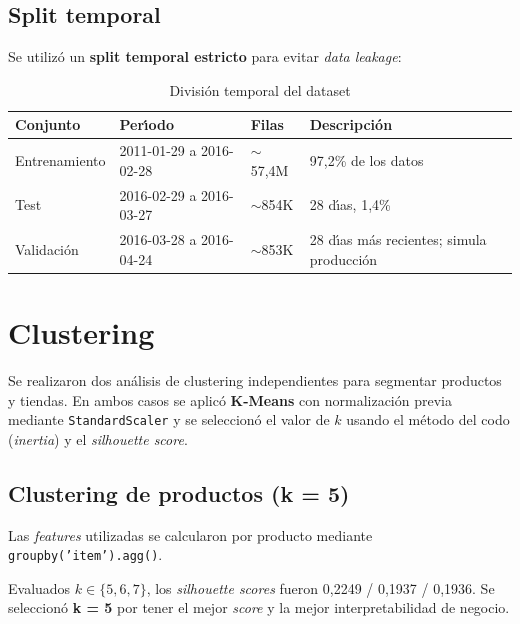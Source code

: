 \documentclass[12pt, a4paper, oneside]{report}
\newcommand{\code}[1]{\texttt{\small\color{codeblue}#1}}
\begin{document}
\subsection{Split temporal}

Se utiliz\'o un \textbf{split temporal estricto} para evitar \textit{data leakage}:

\begin{table}[H]
  \centering
  \caption{Divisi\'on temporal del dataset}
  \label{tab:split}
  \begin{tabularx}{\textwidth}{L{2.2cm} L{4.5cm} C{2cm} X}
    \toprule
    {\color{white}\textbf{Conjunto}} &
    {\color{white}\textbf{Per\'{\i}odo}} &
    {\color{white}\textbf{Filas}} &
    {\color{white}\textbf{Descripci\'on}} \\
    \midrule
       Entrenamiento & 2011-01-29 a 2016-02-28 & $\sim$57,4M & 97,2\% de los datos \\
      Test          & 2016-02-29 a 2016-03-27 & $\sim$854K  & 28 d\'{\i}as, 1,4\% \\
       Validaci\'on    & 2016-03-28 a 2016-04-24 & $\sim$853K  & 28 d\'{\i}as m\'as recientes; simula producci\'on \\
    \bottomrule
  \end{tabularx}
\end{table}

\section{Clustering}

Se realizaron dos an\'alisis de clustering independientes para segmentar productos y tiendas. En ambos casos se aplic\'o \textbf{K-Means} con normalizaci\'on previa mediante \code{StandardScaler} y se seleccion\'o el valor de $k$ usando el m\'etodo del codo (\textit{inertia}) y el \textit{silhouette score}.

\subsection{Clustering de productos (k = 5)}

Las \textit{features} utilizadas se calcularon por producto mediante \code{groupby('item').agg()}.

Evaluados $k \in \{5, 6, 7\}$, los \textit{silhouette scores} fueron 0,2249 / 0,1937 / 0,1936. Se seleccion\'o \textbf{k = 5} por tener el mejor \textit{score} y la mejor interpretabilidad de negocio.
\end{document}
